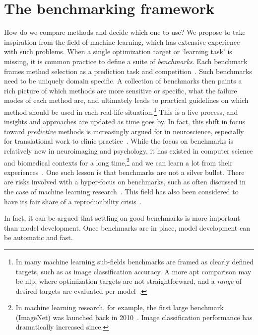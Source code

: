 \clearpage
\section{The benchmarking framework}\label{sec:benchmark-framework}

How do we compare methods and decide which one to use?
We propose to take inspiration from the field of machine learning, which has extensive experience with such problems.
%
When a single optimization target or `learning task' is missing, it is common practice to define a suite of \emph{benchmarks}.
Each benchmark frames method selection as a prediction task and competition~\parencite{Breiman2001, Shmueli2010, Bzdok2018, Khosla2019, Poldrack2020, Tejavibulya2022}.
Such benchmarks need to be uniquely domain specific.
A collection of benchmarks then paints a rich picture of which methods are more sensitive or specific, what the failure modes of each method are, and ultimately leads to practical guidelines on which method should be used in each real-life situation.\footnote{In many machine learning sub-fields benchmarks are framed as clearly defined targets, such as as image classification accuracy. A more apt comparison may be \gls{nlp}, where optimization targets are not straightforward, and a \emph{range} of desired targets are evaluated per model~\parencite[see e.g.][]{Bommasani2021}.}
This is a live process, and insights and approaches are updated as time goes by.
%
In fact, this shift in focus toward \emph{predictive} methods is increasingly argued for in neuroscience, especially for translational work to clinic practice~\parencite{Yarkoni2017, Leenings2022, Voytek2022}.
While the focus on benchmarks is relatively new in neuroimaging and psychology, it has existed in computer science and biomedical contexts for a long time,\footnote{In machine learning research, for example, the first large benchmark (ImageNet) was launched back in 2010~\parencite{Deng2009}. Image classification performance has dramatically increased since.} and we can learn a lot from their experiences~\parencite{Leenings2022}.
%
One such lesson is that benchmarks are not a silver bullet.
There are risks involved with a hyper-focus on benchmarks, such as often discussed in the case of machine learning research~\parencite{Wagstaff2012, Sculley2018}.
This field has also been considered to have its fair share of a reproducibility crisis~\parencite[see also][]{Bell2021}.

In fact, it can be argued that settling on good benchmarks is more important than model development.
Once benchmarks are in place, model development can be automatic and fast.

